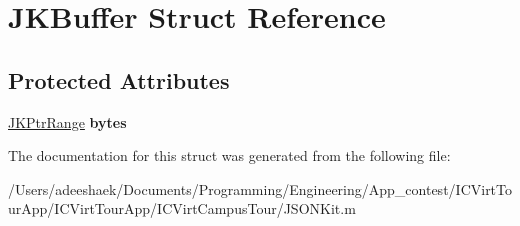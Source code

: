 \hypertarget{struct_j_k_buffer}{\section{J\-K\-Buffer Struct Reference}
\label{struct_j_k_buffer}
}
\subsection*{Protected Attributes}
\begin{DoxyCompactItemize}
\item 
\hypertarget{struct_j_k_buffer_a1bcbb622829922c149b26f454912a746}{\hyperlink{struct_j_k_ptr_range}{J\-K\-Ptr\-Range} {\bfseries bytes}}\label{struct_j_k_buffer_a1bcbb622829922c149b26f454912a746}

\end{DoxyCompactItemize}


The documentation for this struct was generated from the following file\-:\begin{DoxyCompactItemize}
\item 
/\-Users/adeeshaek/\-Documents/\-Programming/\-Engineering/\-App\-\_\-contest/\-I\-C\-Virt\-Tour\-App/\-I\-C\-Virt\-Tour\-App/\-I\-C\-Virt\-Campus\-Tour/J\-S\-O\-N\-Kit.\-m\end{DoxyCompactItemize}
